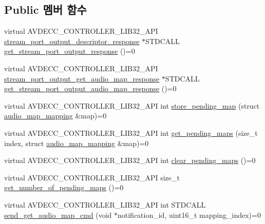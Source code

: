 \subsection*{Public 멤버 함수}
\begin{DoxyCompactItemize}
\item 
virtual A\+V\+D\+E\+C\+C\+\_\+\+C\+O\+N\+T\+R\+O\+L\+L\+E\+R\+\_\+\+L\+I\+B32\+\_\+\+A\+PI \hyperlink{classavdecc__lib_1_1stream__port__output__descriptor__response}{stream\+\_\+port\+\_\+output\+\_\+descriptor\+\_\+response} $\ast$S\+T\+D\+C\+A\+LL \hyperlink{classavdecc__lib_1_1stream__port__output__descriptor_ad55a65e8648f66713ad5c9a7b9fa7181}{get\+\_\+stream\+\_\+port\+\_\+output\+\_\+response} ()=0
\item 
virtual A\+V\+D\+E\+C\+C\+\_\+\+C\+O\+N\+T\+R\+O\+L\+L\+E\+R\+\_\+\+L\+I\+B32\+\_\+\+A\+PI \hyperlink{classavdecc__lib_1_1stream__port__output__get__audio__map__response}{stream\+\_\+port\+\_\+output\+\_\+get\+\_\+audio\+\_\+map\+\_\+response} $\ast$S\+T\+D\+C\+A\+LL \hyperlink{classavdecc__lib_1_1stream__port__output__descriptor_a4c10a3bd18d5f4e7220778ed34fe2a98}{get\+\_\+stream\+\_\+port\+\_\+output\+\_\+audio\+\_\+map\+\_\+response} ()=0
\item 
virtual A\+V\+D\+E\+C\+C\+\_\+\+C\+O\+N\+T\+R\+O\+L\+L\+E\+R\+\_\+\+L\+I\+B32\+\_\+\+A\+PI int \hyperlink{classavdecc__lib_1_1stream__port__output__descriptor_ac1774e84412c74378819f20d257a7653}{store\+\_\+pending\+\_\+map} (struct \hyperlink{structavdecc__lib_1_1audio__map__mapping}{audio\+\_\+map\+\_\+mapping} \&map)=0
\item 
virtual A\+V\+D\+E\+C\+C\+\_\+\+C\+O\+N\+T\+R\+O\+L\+L\+E\+R\+\_\+\+L\+I\+B32\+\_\+\+A\+PI int \hyperlink{classavdecc__lib_1_1stream__port__output__descriptor_aaa56e01b09f3ff3f29037216607e556e}{get\+\_\+pending\+\_\+maps} (size\+\_\+t index, struct \hyperlink{structavdecc__lib_1_1audio__map__mapping}{audio\+\_\+map\+\_\+mapping} \&map)=0
\item 
virtual A\+V\+D\+E\+C\+C\+\_\+\+C\+O\+N\+T\+R\+O\+L\+L\+E\+R\+\_\+\+L\+I\+B32\+\_\+\+A\+PI int \hyperlink{classavdecc__lib_1_1stream__port__output__descriptor_ad7e55593254a186706fcd8d861ccdef8}{clear\+\_\+pending\+\_\+maps} ()=0
\item 
virtual A\+V\+D\+E\+C\+C\+\_\+\+C\+O\+N\+T\+R\+O\+L\+L\+E\+R\+\_\+\+L\+I\+B32\+\_\+\+A\+PI size\+\_\+t \hyperlink{classavdecc__lib_1_1stream__port__output__descriptor_ab97aa51efdb274b6226d04c41f2d974e}{get\+\_\+number\+\_\+of\+\_\+pending\+\_\+maps} ()=0
\item 
virtual A\+V\+D\+E\+C\+C\+\_\+\+C\+O\+N\+T\+R\+O\+L\+L\+E\+R\+\_\+\+L\+I\+B32\+\_\+\+A\+PI int S\+T\+D\+C\+A\+LL \hyperlink{classavdecc__lib_1_1stream__port__output__descriptor_a685ec3b997e066fc3530a3cd213f581b}{send\+\_\+get\+\_\+audio\+\_\+map\+\_\+cmd} (void $\ast$notification\+\_\+id, uint16\+\_\+t mapping\+\_\+index)=0

\end{DoxyCompactItemize}
